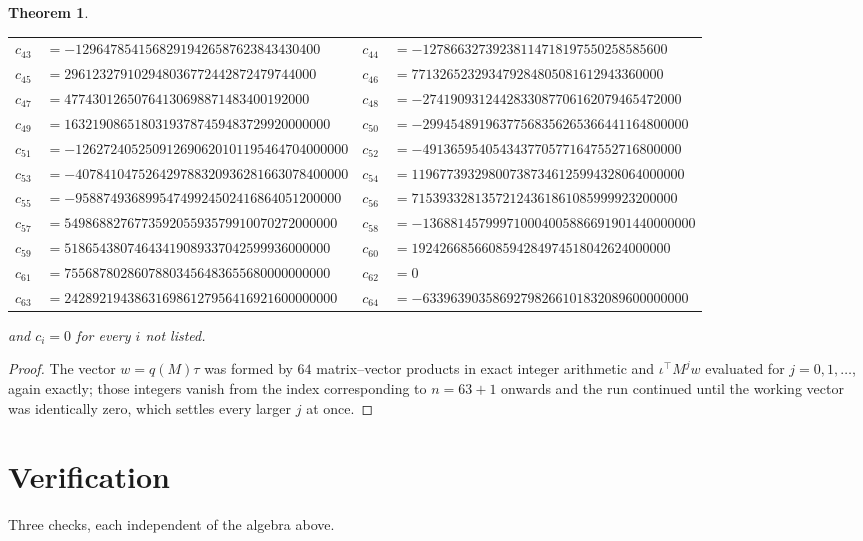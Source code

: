 \documentclass[11pt,a4paper]{article}
\theoremstyle{plain}
\newtheorem{theorem}{Theorem}
\theoremstyle{definition}
\begin{document}
\begin{theorem}
\begin{center}
\begin{tabular}{r@{\,}l@{\qquad}r@{\,}l}
$c_{43}$ & $=-12964785415682919426587623843430400$ & $c_{44}$ & $=-12786632739238114718197550258585600$ \\
$c_{45}$ & $=296123279102948036772442872479744000$ & $c_{46}$ & $=771326523293479284805081612943360000$ \\
$c_{47}$ & $=47743012650764130698871483400192000$ & $c_{48}$ & $=-2741909312442833087706162079465472000$ \\
$c_{49}$ & $=16321908651803193787459483729920000000$ & $c_{50}$ & $=-29945489196377568356265366441164800000$ \\
$c_{51}$ & $=-126272405250912690620101195464704000000$ & $c_{52}$ & $=-4913659540543437705771647552716800000$ \\
$c_{53}$ & $=-407841047526429788320936281663078400000$ & $c_{54}$ & $=119677393298007387346125994328064000000$ \\
$c_{55}$ & $=-95887493689954749924502416864051200000$ & $c_{56}$ & $=71539332813572124361861085999923200000$ \\
$c_{57}$ & $=549868827677359205593579910070272000000$ & $c_{58}$ & $=-136881457999710004005886691901440000000$ \\
$c_{59}$ & $=51865438074643419089337042599936000000$ & $c_{60}$ & $=1924266856608594284974518042624000000$ \\
$c_{61}$ & $=75568780286078803456483655680000000000$ & $c_{62}$ & $=0$ \\
$c_{63}$ & $=242892194386316986127956416921600000000$ & $c_{64}$ & $=-63396390358692798266101832089600000000$ \\
\end{tabular}
\end{center}
and $c_i=0$ for every $i$ not listed.
\end{theorem}

\begin{proof}
The vector $w=q(M)\tau$ was formed by $64$ matrix--vector products in exact integer
arithmetic and $\iota^{\!\top}M^{j}w$ evaluated for $j=0,1,\dots$, again exactly; those
integers vanish from the index corresponding to $n=63+1$ onwards and the run continued
until the working vector was identically zero, which settles every larger $j$ at once.
\end{proof}

\section{Verification}

Three checks, each independent of the algebra above.
\end{document}
